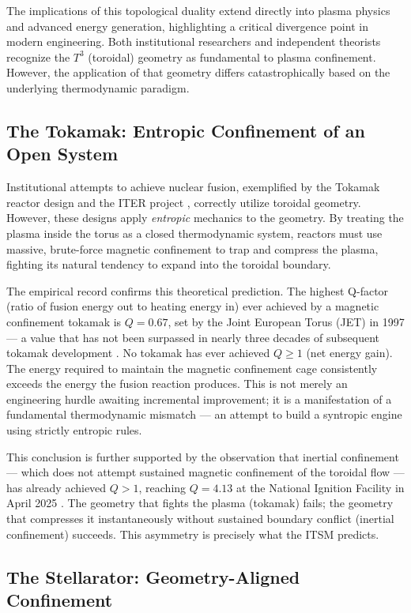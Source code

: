 \documentclass[aps,prd,11pt,onecolumn,superscriptaddress,nofootinbib,floatfix]{revtex4-2}
\begin{document}
The implications of this topological duality extend directly into plasma physics and advanced energy generation, highlighting a critical divergence point in modern engineering. Both institutional researchers and independent theorists recognize the $T^3$ (toroidal) geometry as fundamental to plasma confinement. However, the application of that geometry differs catastrophically based on the underlying thermodynamic paradigm.

\subsection{The Tokamak: Entropic Confinement of an Open System}

Institutional attempts to achieve nuclear fusion, exemplified by the Tokamak reactor design and the ITER project \cite{iter_basis}, correctly utilize toroidal geometry. However, these designs apply \textit{entropic} mechanics to the geometry. By treating the plasma inside the torus as a closed thermodynamic system, reactors must use massive, brute-force magnetic confinement to trap and compress the plasma, fighting its natural tendency to expand into the toroidal boundary.

The empirical record confirms this theoretical prediction. The highest Q-factor (ratio of fusion energy out to heating energy in) ever achieved by a magnetic confinement tokamak is $Q = 0.67$, set by the Joint European Torus (JET) in 1997 --- a value that has not been surpassed in nearly three decades of subsequent tokamak development \cite{fusion_q_2025}. No tokamak has ever achieved $Q \geq 1$ (net energy gain). The energy required to maintain the magnetic confinement cage consistently exceeds the energy the fusion reaction produces. This is not merely an engineering hurdle awaiting incremental improvement; it is a manifestation of a fundamental thermodynamic mismatch --- an attempt to build a syntropic engine using strictly entropic rules.

This conclusion is further supported by the observation that inertial confinement --- which does not attempt sustained magnetic confinement of the toroidal flow --- has already achieved $Q > 1$, reaching $Q = 4.13$ at the National Ignition Facility in April 2025 \cite{fusion_q_2025}. The geometry that fights the plasma (tokamak) fails; the geometry that compresses it instantaneously without sustained boundary conflict (inertial confinement) succeeds. This asymmetry is precisely what the ITSM predicts.

\subsection{The Stellarator: Geometry-Aligned Confinement}
\end{document}
